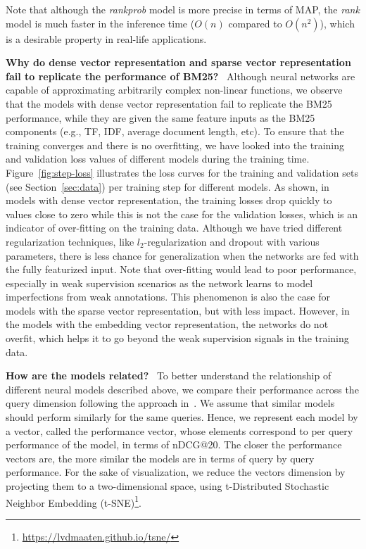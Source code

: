 \documentclass[sigconf]{acmart}
\newcommand{\modeltwo}{\textit{rank} model\xspace}
\newcommand{\modelthree}{\textit{rank\-prob} model\xspace}
\newcommand{\feedone}{dense vector representation\xspace}
\newcommand{\feedtwo}{sparse vector representation\xspace}
\newcommand{\feedthree}{embedding vector representation\xspace}
\newcommand{\mypar}[1]{\vspace*{-0.1ex}\medskip\noindent\textbf{#1}~}
\begin{document}
Note that although the \modelthree is more precise in terms of MAP, the \modeltwo is much faster in the inference time ($O(n)$ compared to $O(n^2)$), which is a desirable property in real-life applications.




\mypar{Why do \feedone and \feedtwo fail to replicate the performance of BM25?}
%
Although neural networks are capable of approximating arbitrarily complex non-linear functions, we observe that the models with \feedone fail to replicate the BM25 performance, while they are given the same feature inputs as the BM25 components (e.g., TF, IDF, average document length, etc). To ensure that the training converges and there is no overfitting, we have looked into the training and validation loss values of different models during the training time. Figure~\ref{fig:step-loss} illustrates the loss curves for the training and validation sets (see Section~\ref{sec:data}) per training step for different models.
%
As shown, in models with \feedone, the training losses drop quickly to values close to zero while this is not the case for the validation losses, which is an indicator of over-fitting on the training data. 
Although we have tried different regularization techniques, like $l_2$-regularization and dropout with various parameters, there is less chance for generalization when the networks are fed with the fully featurized input. Note that over-fitting would lead to poor performance, especially in weak supervision scenarios as the network learns to model imperfections from weak annotations. 
%
This phenomenon is also the case for models with the \feedtwo, but with less impact. However, in the models with the \feedthree, the networks do not overfit, which helps it to go beyond the weak supervision signals in the training data.

\mypar{How are the models related?}
%
To better understand the relationship of different neural models described above, we compare their performance across the query dimension following the approach in~\citep{Mitra:2016}. 
We assume that similar models should perform similarly for the same queries. Hence, we represent each model by a vector, called the performance vector, whose elements correspond to per query performance of the model, in terms of nDCG@20. The closer the performance vectors are, the more similar the models are in terms of query by query performance. For the sake of visualization, we reduce the vectors dimension by projecting them to a two-dimensional space, using t-Distributed Stochastic Neighbor Embedding (t-SNE)\footnote{\url{https://lvdmaaten.github.io/tsne/}}.
\end{document}
